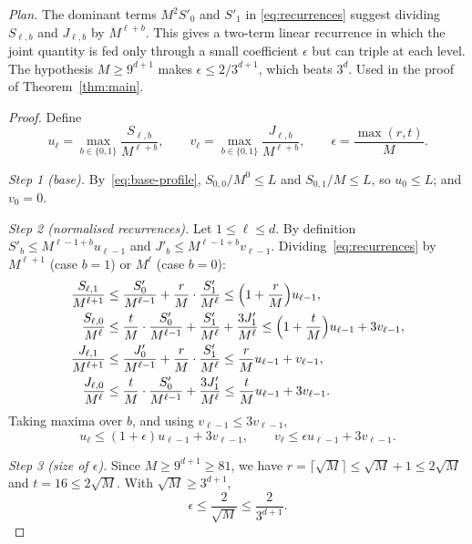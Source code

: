 \documentclass[11pt]{article}
\theoremstyle{definition}
\theoremstyle{remark}
\begin{document}
\emph{Plan.} The dominant terms $M^2S'_0$ and $S'_1$ in
\eqref{eq:recurrences} suggest dividing $S_{\ell,b}$ and $J_{\ell,b}$ by
$M^{\ell+b}$. This gives a two-term linear recurrence in which the joint
quantity is fed only through a small coefficient $\epsilon$ but can triple at
each level. The hypothesis $M\ge9^{d+1}$ makes $\epsilon\le2/3^{d+1}$, which
beats $3^d$. Used in the proof of Theorem~\ref{thm:main}.

\begin{proof}
Define
\[
 u_\ell=\max_{b\in\{0,1\}}\frac{S_{\ell,b}}{M^{\ell+b}},
 \qquad
 v_\ell=\max_{b\in\{0,1\}}\frac{J_{\ell,b}}{M^{\ell+b}},
 \qquad
 \epsilon=\frac{\max(r,t)}{M}.
\]

\emph{Step 1 (base).} By~\eqref{eq:base-profile}, $S_{0,0}/M^0\le L$ and
$S_{0,1}/M\le L$, so $u_0\leq L$; and $v_0=0$.

\emph{Step 2 (normalised recurrences).} Let $1\le\ell\le d$. By definition
$S'_b\le M^{\ell-1+b}u_{\ell-1}$ and $J'_b\le M^{\ell-1+b}v_{\ell-1}$.
Dividing~\eqref{eq:recurrences} by $M^{\ell+1}$ (case $b=1$) or $M^\ell$ (case
$b=0$):
\begin{align*}
 \frac{S_{\ell,1}}{M^{\ell+1}}
   &\le\frac{S'_0}{M^{\ell-1}}+\frac rM\cdot\frac{S'_1}{M^{\ell}}
   \le\Bigl(1+\frac rM\Bigr)u_{\ell-1},\\
 \frac{S_{\ell,0}}{M^\ell}
   &\le\frac tM\cdot\frac{S'_0}{M^{\ell-1}}+\frac{S'_1}{M^\ell}+\frac{3J'_1}{M^\ell}
   \le\Bigl(1+\frac tM\Bigr)u_{\ell-1}+3v_{\ell-1},\\
 \frac{J_{\ell,1}}{M^{\ell+1}}
   &\le\frac{J'_0}{M^{\ell-1}}+\frac rM\cdot\frac{S'_1}{M^{\ell}}
   \le\frac rM u_{\ell-1}+v_{\ell-1},\\
 \frac{J_{\ell,0}}{M^\ell}
   &\le\frac tM\cdot\frac{S'_0}{M^{\ell-1}}+\frac{3J'_1}{M^\ell}
   \le\frac tM u_{\ell-1}+3v_{\ell-1}.
\end{align*}
Taking maxima over $b$, and using $v_{\ell-1}\le3v_{\ell-1}$,
\begin{equation}
\label{eq:normalized-recurrences}
  u_\ell\leq (1+\epsilon)u_{\ell-1}+3v_{\ell-1},\qquad
  v_\ell\leq \epsilon u_{\ell-1}+3v_{\ell-1}.
\end{equation}

\emph{Step 3 (size of $\epsilon$).} Since $M\ge9^{d+1}\geq81$, we have
$r=\lceil\sqrt M\rceil\leq\sqrt M+1\le2\sqrt M$ and
$t=16\leq2\sqrt M$. With $\sqrt M\ge3^{d+1}$,
\begin{equation}
\label{eq:epsilon-choice}
 \epsilon\leq\frac{2}{\sqrt M}\leq\frac{2}{3^{d+1}}.
\end{equation}


\end{proof}
\end{document}
